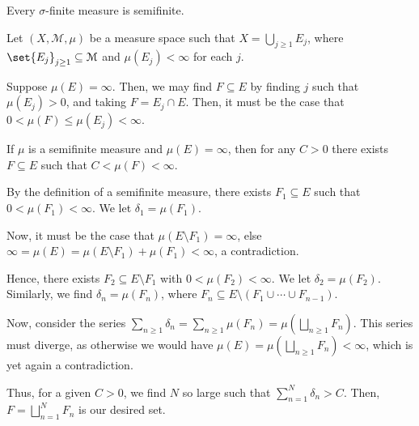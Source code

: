 \documentclass[10pt]{mypackage}
\begin{document}
\begin{exercise}[Exercise 13]
  Every $\sigma$-finite measure is semifinite.
\end{exercise}
\begin{solution}
  Let $\left(X,\mathcal{M},\mu\right)$ be a measure space such that $X = \bigcup_{j\geq 1}E_j$, where $\set{E_j}_{j\geq 1}\subseteq \mathcal{M}$ and $\mu\left(E_j\right) < \infty$ for each $j$.\newline

  Suppose $\mu\left(E\right) = \infty$. Then, we may find $F\subseteq E$ by finding $j$ such that $\mu\left(E_j\right) > 0$, and taking $F = E_j\cap E$. Then, it must be the case that $0 < \mu\left(F\right) \leq \mu\left(E_j\right) < \infty$.
\end{solution}
\begin{exercise}[Exercise 14]
  If $\mu$ is a semifinite measure and $\mu\left(E\right) = \infty$, then for any $C > 0$ there exists $F\subseteq E$ such that $C < \mu\left(F\right) < \infty$.
\end{exercise}
\begin{solution}
  By the definition of a semifinite measure, there exists $F_1\subseteq E$ such that $0 < \mu\left(F_1\right) < \infty$. We let $\delta_1 = \mu\left(F_1\right)$.\newline

  Now, it must be the case that $\mu\left(E\setminus F_1\right) = \infty$, else $\infty = \mu\left(E\right) = \mu\left(E\setminus F_1\right) + \mu\left(F_1\right) < \infty$, a contradiction.\newline

  Hence, there exists $F_2\subseteq E\setminus F_1$ with $0 < \mu\left(F_2\right) < \infty$. We let $\delta_2 = \mu\left(F_2\right)$. Similarly, we find $\delta_n = \mu\left(F_n\right)$, where $F_n \subseteq E\setminus \left(F_1\cup\cdots\cup F_{n-1}\right)$.\newline

  Now, consider the series $\sum_{n\geq 1}\delta_n = \sum_{n\geq 1}\mu\left(F_n\right) = \mu\left(\bigsqcup_{n\geq 1}F_n\right)$. This series must diverge, as otherwise we would have $\mu\left(E\right) = \mu\left(\bigsqcup_{n\geq 1}F_n\right) < \infty$, which is yet again a contradiction.\newline

  Thus, for a given $C > 0$, we find $N$ so large such that $\sum_{n=1}^{N}\delta_n > C$. Then, $F = \bigsqcup_{n=1}^{N}F_n$ is our desired set.
\end{solution}
\end{document}
